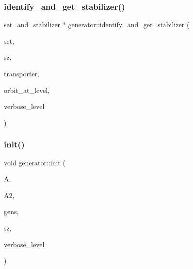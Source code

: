 \subsubsection{\texorpdfstring{identify\+\_\+and\+\_\+get\+\_\+stabilizer()}{identify\_and\_get\_stabilizer()}}
{\footnotesize\ttfamily \mbox{\hyperlink{classset__and__stabilizer}{set\+\_\+and\+\_\+stabilizer}} $\ast$ generator\+::identify\+\_\+and\+\_\+get\+\_\+stabilizer (\begin{DoxyParamCaption}\item[{\mbox{\hyperlink{galois_8h_a09fddde158a3a20bd2dcadb609de11dc}{I\+NT}} $\ast$}]{set,  }\item[{\mbox{\hyperlink{galois_8h_a09fddde158a3a20bd2dcadb609de11dc}{I\+NT}}}]{sz,  }\item[{\mbox{\hyperlink{galois_8h_a09fddde158a3a20bd2dcadb609de11dc}{I\+NT}} $\ast$}]{transporter,  }\item[{\mbox{\hyperlink{galois_8h_a09fddde158a3a20bd2dcadb609de11dc}{I\+NT}} \&}]{orbit\+\_\+at\+\_\+level,  }\item[{\mbox{\hyperlink{galois_8h_a09fddde158a3a20bd2dcadb609de11dc}{I\+NT}}}]{verbose\+\_\+level }\end{DoxyParamCaption})}

\mbox{\label{classgenerator_aeca1559b4172cae921620768bd62df47}} 
\subsubsection{\texorpdfstring{init()}{init()}}
{\footnotesize\ttfamily void generator\+::init (\begin{DoxyParamCaption}\item[{\mbox{\hyperlink{classaction}{action}} $\ast$}]{A,  }\item[{\mbox{\hyperlink{classaction}{action}} $\ast$}]{A2,  }\item[{\mbox{\hyperlink{classstrong__generators}{strong\+\_\+generators}} $\ast$}]{gens,  }\item[{\mbox{\hyperlink{galois_8h_a09fddde158a3a20bd2dcadb609de11dc}{I\+NT}}}]{sz,  }\item[{\mbox{\hyperlink{galois_8h_a09fddde158a3a20bd2dcadb609de11dc}{I\+NT}}}]{verbose\+\_\+level }\end{DoxyParamCaption})}

\mbox{\label{classgenerator_aed44ec3121281f847612a646968f0894}} 
